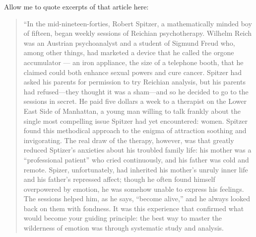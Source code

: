 \begin{refsection}
Allow me to quote excerpts of that article here:

\begin{quote}

“In the mid-nineteen-forties, Robert Spitzer, a mathematically minded boy of fifteen, began weekly sessions of Reichian psychotherapy. Wilhelm Reich was an Austrian psychoanalyst and a student of Sigmund Freud who, among other things, had marketed a device that he called the orgone accumulator — an iron appliance, the size of a telephone booth, that he claimed could both enhance sexual powers and cure cancer. Spitzer had asked his parents for permission to try Reichian analysis, but his parents had refused—they thought it was a sham—and so he decided to go to the sessions in secret. He paid five dollars a week to a therapist on the Lower East Side of Manhattan, a young man willing to talk frankly about the single most compelling issue Spitzer had yet encountered: women. Spitzer found this methodical approach to the enigma of attraction soothing and invigorating. The real draw of the therapy, however, was that greatly reduced Sptizer's anxieties about his troubled family life: his mother was a “professional patient” who cried continuously, and his father was cold and remote. Spizer, unfortunately, had inherited his mother's unruly inner life and his father's repressed affect; though he often found himself overpowered by emotion, he was somehow unable to express his feelings. The sessions helped him, as he says, “become alive,” and he always looked back on them with fondness. It was this experience that confirmed what would become your guiding principle: the best way to master the wilderness of emotion was through systematic study and analysis.


\end{quote}
\end{refsection}
